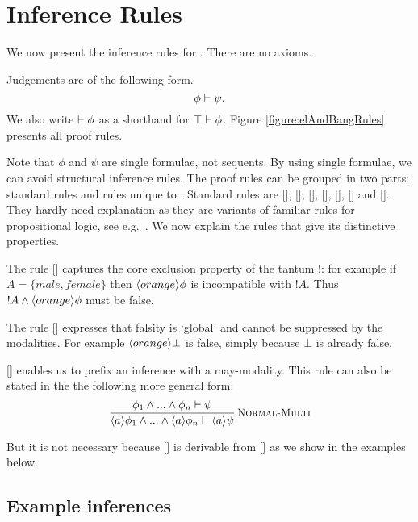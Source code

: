 \section{Inference Rules}\label{elAndBangMore}



\NI We now present the inference rules for \cathoristic{}. There are no
axioms.

\begin{definition} Judgements are of the following form.
\[
  \phi \vdash \psi.
\]
We also write $\vdash \phi$ as a shorthand for $\top \vdash
\phi$. Figure \ref{figure:elAndBangRules}
presents all proof rules.
\end{definition}

\NI Note that $\phi$ and $\psi$ are single formulae, not sequents.  By
using single formulae, we can avoid structural inference rules.  The
proof rules can be grouped in two parts: standard rules and rules
unique to \cathoristic{}.  Standard rules are [],
[], [],
[], [],
[] and []. They hardly need
explanation as they are variants of familiar rules for propositional
logic, see e.g.~\cite{TroelstraAS:basprot,vanDalenD:logstr}.  We now
explain the rules that give \cathoristic{} its distinctive properties.

The rule []  captures the core
exclusion property of the tantum !: for example if $A = \{male, female\}$
then $\langle orange \rangle \phi$ is incompatible with $!A$. Thus $!A \land
\langle orange \rangle \phi$ must be false.

The rule [] expresses that falsity is `global'
  and cannot be suppressed by the modalities. For example
  $\langle orange \rangle \bot$ is false, simply because $\bot$ is already
  false.

[] enables us to prefix an inference with a
may-modality.  This rule can also be stated in the the following more
general form:
\[
   \frac{\displaystyle{ 
     \phi_1\land...\land\phi_n \vdash\psi
    }}{\displaystyle{ 
     \langle a \rangle \phi_1\land...\land\langle a \rangle \phi_n \vdash\langle a \rangle \psi
    }}\,\textsc{\small Normal-Multi}
\]

\NI But it is not necessary because [] is
derivable from [] as we show in the examples below.

\subsection{Example inferences}

